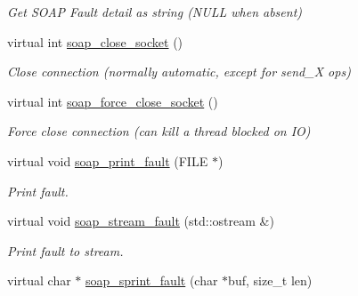 \begin{DoxyCompactItemize}
\begin{DoxyCompactList}\small\item\em Get SOAP Fault detail as string (NULL when absent) \end{DoxyCompactList}\item 
\hypertarget{classOntologyQuerySoapBindingProxy_aa81dfbaa4142cbd0a17d2dd9849bbd04}{
virtual int \hyperlink{classOntologyQuerySoapBindingProxy_aa81dfbaa4142cbd0a17d2dd9849bbd04}{soap\_\-close\_\-socket} ()}
\label{classOntologyQuerySoapBindingProxy_aa81dfbaa4142cbd0a17d2dd9849bbd04}

\begin{DoxyCompactList}\small\item\em Close connection (normally automatic, except for send\_\-X ops) \end{DoxyCompactList}\item 
\hypertarget{classOntologyQuerySoapBindingProxy_ad8c717aa7a6f5fbdc5c70a13e7bee8bf}{
virtual int \hyperlink{classOntologyQuerySoapBindingProxy_ad8c717aa7a6f5fbdc5c70a13e7bee8bf}{soap\_\-force\_\-close\_\-socket} ()}
\label{classOntologyQuerySoapBindingProxy_ad8c717aa7a6f5fbdc5c70a13e7bee8bf}

\begin{DoxyCompactList}\small\item\em Force close connection (can kill a thread blocked on IO) \end{DoxyCompactList}\item 
\hypertarget{classOntologyQuerySoapBindingProxy_ad70530bfc2697672d891aa435ed08ce1}{
virtual void \hyperlink{classOntologyQuerySoapBindingProxy_ad70530bfc2697672d891aa435ed08ce1}{soap\_\-print\_\-fault} (FILE $\ast$)}
\label{classOntologyQuerySoapBindingProxy_ad70530bfc2697672d891aa435ed08ce1}

\begin{DoxyCompactList}\small\item\em Print fault. \end{DoxyCompactList}\item 
\hypertarget{classOntologyQuerySoapBindingProxy_a1e8d7dcc80cc7c361eb56d62b175591f}{
virtual void \hyperlink{classOntologyQuerySoapBindingProxy_a1e8d7dcc80cc7c361eb56d62b175591f}{soap\_\-stream\_\-fault} (std::ostream \&)}
\label{classOntologyQuerySoapBindingProxy_a1e8d7dcc80cc7c361eb56d62b175591f}

\begin{DoxyCompactList}\small\item\em Print fault to stream. \end{DoxyCompactList}\item 
\hypertarget{classOntologyQuerySoapBindingProxy_a8962ad397937f0fd49245cca01ccb51d}{
virtual char $\ast$ \hyperlink{classOntologyQuerySoapBindingProxy_a8962ad397937f0fd49245cca01ccb51d}{soap\_\-sprint\_\-fault} (char $\ast$buf, size\_\-t len)}
\label{classOntologyQuerySoapBindingProxy_a8962ad397937f0fd49245cca01ccb51d}


\end{DoxyCompactItemize}
